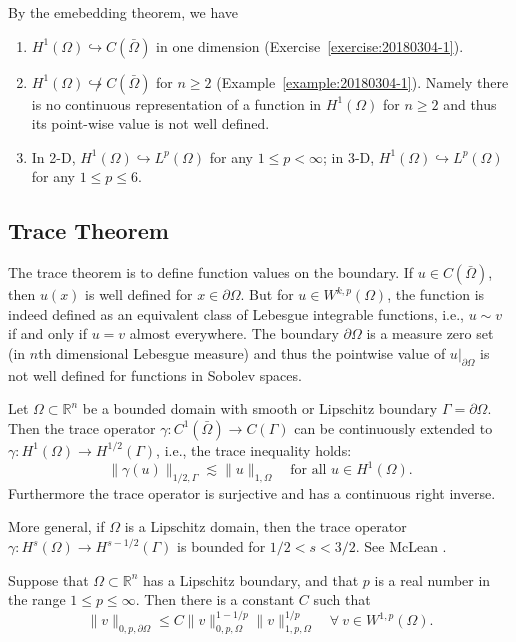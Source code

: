 \begin{example}
By the emebedding theorem, we have
\begin{enumerate}
\item $H^1(\Omega)\hookrightarrow C(\bar{\Omega})$ in one dimension (Exercise~\ref{exercise:20180304-1}).
\item $H^1(\Omega)\not\hookrightarrow C(\bar{\Omega})$ for $n\geq2$ (Example~\ref{example:20180304-1}).
Namely there is no continuous representation of a function in $H^1(\Omega)$ for $n\geq2$ and thus its point-wise value is
not well defined.
\item In 2-D, $H^1(\Omega)\hookrightarrow L^p(\Omega)$ for any $1\leq p<\infty$; in 3-D, $H^1(\Omega)\hookrightarrow L^p(\Omega)$ for any $1\leq p\leq6$.
\end{enumerate}
\end{example}


\subsection{Trace Theorem}
The trace theorem is to define function values on the boundary. If
$u\in C(\bar{\Omega})$, then $u(x)$ is well defined for $x\in\partial\Omega$. But for $u\in W^{k,p}(\Omega)$, the function
is indeed defined as an equivalent class of Lebesgue integrable functions, i.e., $u \sim v$ if
and only if $u = v$ almost everywhere. The boundary $\partial\Omega$ is a measure zero set (in $n$th
dimensional Lebesgue measure) and thus the pointwise value of $u|_{\partial\Omega}$ is not well defined
for functions in Sobolev spaces.

\begin{theorem}
Let $\Omega\subset\mathbb R^n$ be a bounded domain with smooth or Lipschitz boundary
$\Gamma=\partial\Omega$. Then the trace operator $\gamma: C^1(\bar{\Omega})\to C(\Gamma)$
 can be continuously extended to
$\gamma: H^1(\Omega)\to H^{1/2}(\Gamma)$, i.e., the trace inequality holds:
\[
\|\gamma(u)\|_{1/2, \Gamma}\lesssim \|u\|_{1, \Omega}\quad \textrm{for all } u\in H^1(\Omega).
\]
Furthermore the trace operator is surjective and has a continuous right inverse.
\end{theorem}

More general, if $\Omega$ is a Lipschitz domain, then the trace operator
$\gamma: H^s(\Omega)\to H^{s-1/2}(\Gamma)$ is bounded for $1/2 < s < 3/2$. See McLean \cite[pages 100-106]{McLean2000}.


\begin{theorem}
Suppose that $\Omega\subset\mathbb R^n$ has a Lipschitz boundary, and that $p$ is a real number in the range $1\leq p\leq \infty$. Then there is a constant $C$ such that
\[
\|v\|_{0, p,\partial\Omega}\leq C\|v\|_{0,p,\Omega}^{1-1/p}\|v\|_{1,p,\Omega}^{1/p}\quad\forall~v\in W^{1,p}(\Omega).
\]
\end{theorem}




